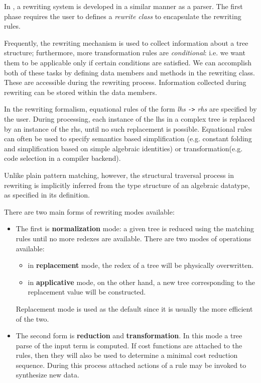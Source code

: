 In \Prop, a rewriting system is developed in a similar manner as a parser.
The first phase requires the user to defines a {\em rewrite class}
to encapsulate the rewriting rules.  

Frequently, the rewriting mechanism is used to collect information about
a tree structure; furthermore, more transformation rules are {\em conditional}:
i.e. we want them to be applicable only if certain conditions are satisfied. 
We can accomplish both of these tasks by defining data members and methods 
in the rewriting class.  These are accessible during the rewriting
process.  Information collected during rewriting can be stored within
the data members.

In the rewriting formalism, equational
rules of the form {\em lhs} \verb|->| {\em rhs} are specified by the user.
During processing, each instance of the lhs in a complex tree is replaced
by an instance of the rhs, until no such replacement is possible.
Equational rules can often be used to specify semantics based simplification
(e.g. constant folding and simplification based on simple algebraic
identities) or transformation(e.g. code selection in a compiler
backend\cite{codegen-with-trees}).
 
Unlike plain pattern matching, however, the structural traversal process
in rewriting is implicitly inferred from the type structure of an
algebraic datatype, as specified in its definition. 
 
There are two main forms of rewriting modes available:
\begin{itemize}
   \item The first is {\bf normalization} mode: a given tree is reduced
using the matching rules until no more redexes are available.  There
are two modes of operations available:
       \begin{itemize}
          \item in {\bf replacement} mode, the redex of a tree will be
physically overwritten.
          \item in {\bf applicative} mode, on the other hand, a new
tree corresponding to the replacement value will be constructed.
       \end{itemize}
     Replacement mode is used as the default since it is usually
the more efficient of the two.
   \item The second form is {\bf reduction} and {\bf transformation}.
In this mode a tree parse of the input term is computed.  If cost functions
are attached to the rules, then they will also be used to determine a
minimal cost reduction sequence.  During this process attached actions of
a rule may be invoked to synthesize new data.
\end{itemize}
 
